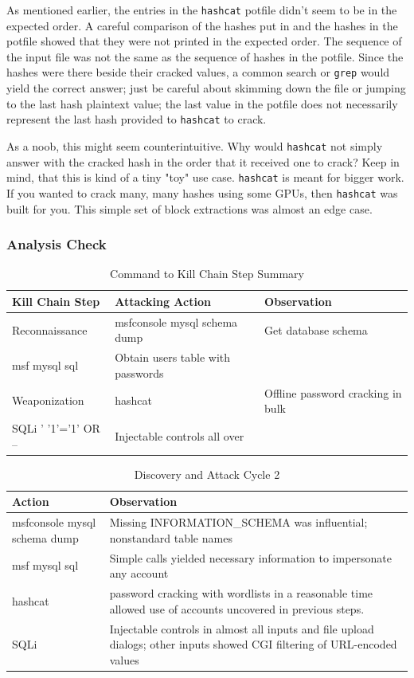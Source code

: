 As mentioned earlier, the entries in the \texttt{hashcat} potfile didn't seem to be in the expected order.  A careful comparison of the hashes put in and the hashes in the potfile showed that they were not printed in the expected order.  The sequence of the input file was not the same as the sequence of hashes in the potfile.  Since the hashes were there beside their cracked values, a common search or \texttt{grep} would yield the correct answer; just be careful about skimming down the file or jumping to the last hash plaintext value; the last value in the potfile does not necessarily represent the last \gls{hash} provided to \texttt{hashcat} to crack.

As a noob, this might seem counterintuitive.  Why would \texttt{hashcat} not simply answer with the cracked \gls{hash} in the order that it received one to crack?  Keep in mind, that this is kind of a tiny "toy" use case.  \texttt{hashcat} is meant for bigger work.  If you wanted to crack many, many hashes using some GPUs, then \texttt{hashcat} was built for you.  This simple set of block extractions was almost an edge case.

\subsubsection{Analysis Check}
\begin{table}[H]
\caption{Command to Kill Chain Step Summary}
\centering
\begin{tabular}{|l|l|l|}
\hline
Kill Chain Step & Attacking Action & Observation \\
\hline
Reconnaissance & msfconsole mysql schema dump & Get database schema \\
msf mysql sql & Obtain users table with passwords &  \\
Weaponization & hashcat & Offline password cracking in bulk \\
SQLi ' '1'='1' OR -- & Injectable controls all over &  \\
\hline
\end{tabular}
\end{table}

\begin{table}[H]
\caption{Discovery and Attack Cycle 2}
\centering
\begin{tabular}{|l|l|}
\hline
Action & Observation \\
\hline
msfconsole mysql schema dump & Missing INFORMATION\_SCHEMA was influential; nonstandard table names \\
msf mysql sql & Simple calls yielded necessary information to impersonate any account \\
hashcat & \gls{password} cracking with wordlists in a reasonable time allowed use of accounts uncovered in previous steps. \\
SQLi & Injectable controls in almost all inputs and file upload dialogs; other inputs showed CGI filtering of URL-encoded values \\
\hline
\end{tabular}
\end{table}

